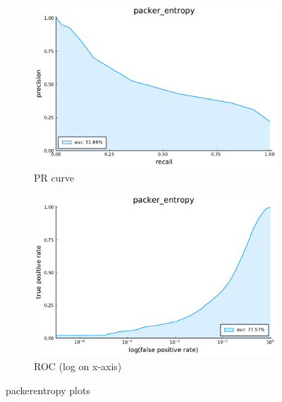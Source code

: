 \begin{figure}
    \centering
    \begin{subfigure}{.49\textwidth}
      \centering
      \includegraphics[width=1\linewidth]{pdfs/modperf/packer_entropy.bson-pr.pdf}
      \caption{PR curve}
    \end{subfigure}
    \begin{subfigure}{.49\textwidth}
        \centering
        \includegraphics[width=1\linewidth]{pdfs/modperf/packer_entropy.bson-roclog.pdf}
        \caption{ROC (log on x-axis)}
    \end{subfigure}
    \caption{packerentropy plots}
    \label{fig:fig}
\end{figure}

